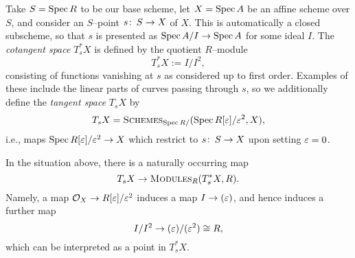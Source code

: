 \begin{definition}\label{DefnOfCoTangentSpaces}
Take \(S = \operatorname{Spec} R\) to be our base scheme, let \(X = \operatorname{Spec} A\) be an affine scheme over \(S\), and consider an \(S\)--point \(s\colon\thinspace S \to X\) of \(X\).  This is automatically a closed subscheme, so that \(s\) is presented as \(\operatorname{Spec} A/I \to \operatorname{Spec} A\) for some ideal \(I\).  The \textit{cotangent space} \(T^*_s X\) is defined by the quotient \(R\)--module \[T^*_s X := I / I^2,\] consisting of functions vanishing at \(s\) as considered up to first order.  Examples of these include the linear parts of curves passing through \(s\), so we additionally define the \textit{tangent space} \(T_s X\) by \[T_s X = \normalfont\textsc{Schemes}_{\operatorname{Spec} R/}(\operatorname{Spec} R[\varepsilon] / \varepsilon^2, X),\] i.e., maps \(\operatorname{Spec} R[\varepsilon] / \varepsilon^2 \to X\) which restrict to \(s\colon\thinspace S \to X\) upon setting \(\varepsilon = 0\).
\end{definition}

\begin{remark}
In the situation above, there is a naturally occurring map \[T_s X \to \normalfont\textsc{Modules}_R(T^*_s X, R).\]  Namely, a map \(\mathcal{O}_X \to R[\varepsilon] / \varepsilon^2\) induces a map \(I \to (\varepsilon)\), and hence induces a further map \[I / I^2 \to (\varepsilon) / (\varepsilon^2) \cong R,\] which can be interpreted as a point in \(T^*_s X\).
\end{remark}

